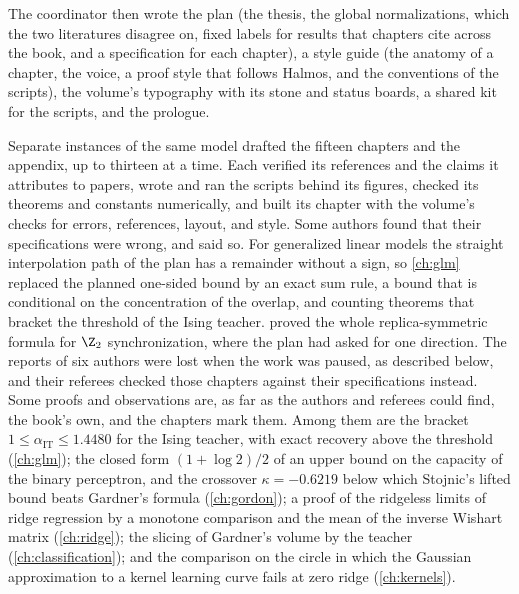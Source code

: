 The coordinator then wrote the plan (the thesis, the global normalizations, which the two literatures disagree on, fixed labels for results that chapters cite across the book, and a specification for each chapter), a style guide (the anatomy of a chapter, the voice, a proof style that follows Halmos, and the conventions of the scripts), the volume's typography with its stone and status boards, a shared kit for the scripts, and the prologue.

Separate instances of the same model drafted the fifteen chapters and the appendix, up to thirteen at a time. Each verified its references and the claims it attributes to papers, wrote and ran the scripts behind its figures, checked its theorems and constants numerically, and built its chapter with the volume's checks for errors, references, layout, and style. Some authors found that their specifications were wrong, and said so. For generalized linear models the straight interpolation path of the plan has a remainder without a sign, so \cref{ch:glm} replaced the planned one-sided bound by an exact sum rule, a bound that is conditional on the concentration of the overlap, and counting theorems that bracket the threshold of the Ising teacher.  proved the whole replica-symmetric formula for $\Z_2$ synchronization, where the plan had asked for one direction. The reports of six authors were lost when the work was paused, as described below, and their referees checked those chapters against their specifications instead. Some proofs and observations are, as far as the authors and referees could find, the book's own, and the chapters mark them. Among them are the bracket $1\le\alpha_{\mathrm{IT}}\le1.4480$ for the Ising teacher, with exact recovery above the threshold (\cref{ch:glm}); the closed form $(1+\log2)/2$ of an upper bound on the capacity of the binary perceptron, and the crossover $\kappa=-0.6219$ below which Stojnic's lifted bound beats Gardner's formula (\cref{ch:gordon}); a proof of the ridgeless limits of ridge regression by a monotone comparison and the mean of the inverse Wishart matrix (\cref{ch:ridge}); the slicing of Gardner's volume by the teacher (\cref{ch:classification}); and the comparison on the circle in which the Gaussian approximation to a kernel learning curve fails at zero ridge (\cref{ch:kernels}).

